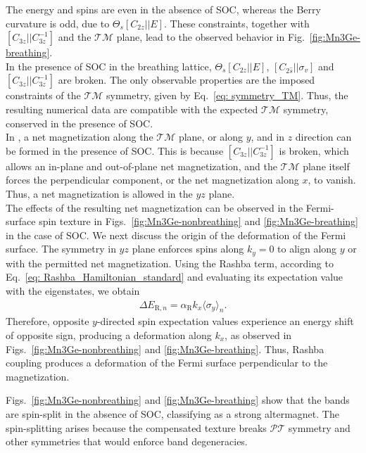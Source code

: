 The energy and spins are even in the absence of SOC, whereas the Berry curvature is odd, due to $\Theta_s[C_{2z}||E]$. These constraints, together with $[C_{3z}||C_{3z}^{-1}]$ and the $\mathcal{TM}$ plane, lead to the observed behavior in Fig.~\ref{fig:Mn3Ge-breathing}.\\
In the presence of SOC in the breathing lattice, $\Theta_s [C_{2z}||E]$, $[C_{2\hat{s}}||\sigma_v]$ and $[C_{3z}||C_{3z}^{-1}]$ are broken. The only observable properties are the imposed constraints of the $\mathcal{TM}$ symmetry, given by Eq.~\eqref{eq: symmetry_TM}. Thus, the resulting numerical data are compatible with the expected $\mathcal{TM}$ symmetry, conserved in the presence of SOC.\\

In , a net magnetization along the $\mathcal{TM}$ plane, or along $y$, and in $z$ direction can be formed in the presence of SOC. This is because $[C_{3z}||C_{3z}^{-1}]$ is broken, which allows an in-plane and out-of-plane net magnetization, and the $\mathcal{TM}$ plane itself forces the perpendicular component, or the net magnetization along $x$, to vanish. Thus, a net magnetization is allowed in the $yz$ plane. \\
The effects of the resulting net magnetization can be observed in the Fermi-surface spin texture in Figs.~\ref{fig:Mn3Ge-nonbreathing} and \ref{fig:Mn3Ge-breathing} in the case of SOC. We next discuss the origin of the deformation of the Fermi surface. The symmetry in $yz$ plane enforces spins along $k_y=0$ to align along $y$ or with the permitted net magnetization. Using the Rashba term, according to Eq.~\eqref{eq: Rashba_Hamiltonian_standard} and evaluating its expectation value with the eigenstates, we obtain
\begin{align}
    \Delta E_{\text{R},n}=\alpha_{\mathrm R}k_x\langle\sigma_y\rangle_n.
\end{align}
Therefore, opposite $y$-directed spin expectation values experience an energy shift of opposite sign, producing a deformation along $k_x$, as observed in Figs.~\ref{fig:Mn3Ge-nonbreathing} and \ref{fig:Mn3Ge-breathing}.
Thus, Rashba coupling produces a deformation of the Fermi surface perpendicular to the magnetization.


Figs.~\ref{fig:Mn3Ge-nonbreathing} and \ref{fig:Mn3Ge-breathing} show that the bands are spin-split in the absence of SOC, classifying  as a strong altermagnet. The spin-splitting arises because the compensated texture breaks $\mathcal{PT}$ symmetry and other symmetries that would enforce band degeneracies.


